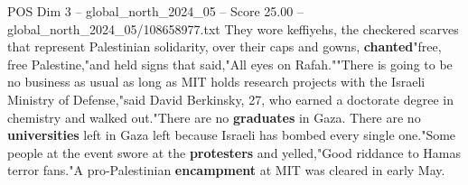 \begin{textsample}{POS Dim 3 – global\_north\_2024\_05 – Score 25.00 – global\_north\_2024\_05/108658977.txt}
They wore keffiyehs, the checkered scarves that represent Palestinian solidarity, over their caps and gowns, \textbf{chanted}"free, free Palestine,"and held signs that said,"All eyes on Rafah.""There is going to be no business as usual as long as MIT holds research projects with the Israeli Ministry of Defense,"said David Berkinsky, 27, who earned a doctorate degree in chemistry and walked out."There are no \textbf{graduates} in Gaza.
There are no \textbf{universities} left in Gaza left because Israeli has bombed every single one."Some people at the event swore at the \textbf{protesters} and yelled,"Good riddance to Hamas terror fans."A pro-Palestinian \textbf{encampment} at MIT was cleared in early May.

\end{textsample}
